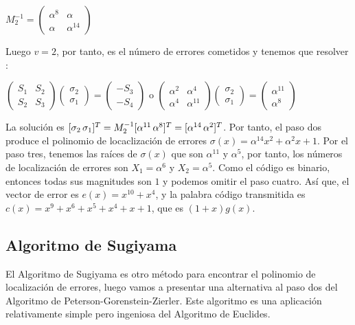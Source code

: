 \begin{exampleth}
$M_2^{-1} = \begin{pmatrix}
			\alpha^8 & \alpha  \\
			\alpha & \alpha^{14}
	\end{pmatrix}$
	
Luego $v=2$, por tanto, es el número de errores cometidos y tenemos que resolver :

$\begin{pmatrix}
			S_1 & S_2  \\
			S_2 & S_3
	\end{pmatrix} \begin{pmatrix}
			\sigma_2 \\
			\sigma_1
	\end{pmatrix} = \begin{pmatrix}
			 -S_3  \\
			 -S_4
	\end{pmatrix} $ o $\begin{pmatrix}
			\alpha^2 & \alpha^4  \\
			\alpha^4 & \alpha^{11}
	\end{pmatrix} \begin{pmatrix}
			\sigma_2 \\
			\sigma_1
	\end{pmatrix} = \begin{pmatrix}
			 \alpha^{11}  \\
			 \alpha^8
	\end{pmatrix} $
	
La solución es $[\sigma_2 \thinspace \sigma_1 ]^T = M_2^{-1}[\alpha^{11} \thinspace \alpha^8]^T = [\alpha^{14} \thinspace \alpha^2]^T$. Por tanto, el paso dos produce el polinomio de locaclización de errores $\sigma(x) = \alpha^{14}x^2 + \alpha^2 x + 1$. Por el paso tres, tenemos las raíces de $\sigma(x)$ que son $\alpha^{11}$ y $\alpha^5$, por tanto, los números de localización de errores son $X_1 = \alpha^6$ y $X_2 =\alpha^5$.
 Como el código es binario, entonces todas sus magnitudes son $1$ y podemos omitir el paso cuatro. Así que, el vector de error es $e(x) = x^{10} + x^4$, y la palabra código transmitida es $c(x) = x^9+x^6+x^5+x^4+x+1$, que es $(1+x)g(x)$.
\end{exampleth}

\subsection{Algoritmo de Sugiyama}

El Algoritmo de Sugiyama es otro método para encontrar el polinomio de localización de errores, luego vamos a presentar una alternativa al paso dos del Algoritmo de Peterson-Gorenstein-Zierler. Este algoritmo es una aplicación relativamente simple pero ingeniosa del Algoritmo de Euclides.

